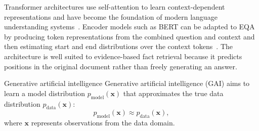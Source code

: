 \documentclass[graybox]{SNmult}
\begin{document}
Transformer architectures use self-attention to learn context-dependent
representations and have become the foundation of modern language understanding
systems~\cite{vaswani2017attention}. Encoder models such as BERT can be adapted
to EQA by producing token representations from the combined question and
context and then estimating start and end distributions over the context
tokens~\cite{devlin2019bert}. The architecture is well suited to evidence-based
fact retrieval because it predicts positions in the original document rather
than freely generating an answer.

\begin{overview}{Generative artificial intelligence}
Generative artificial intelligence (GAI) aims to learn a model distribution
$p_{\mathrm{model}}(\mathbf{x})$ that approximates the true data distribution
$p_{\mathrm{data}}(\mathbf{x})$:
\begin{equation}
p_{\mathrm{model}}(\mathbf{x}) \approx p_{\mathrm{data}}(\mathbf{x}),
\label{eq:gai-def}
\end{equation}
where $\mathbf{x}$ represents observations from the data domain.
\end{overview}
\end{document}
